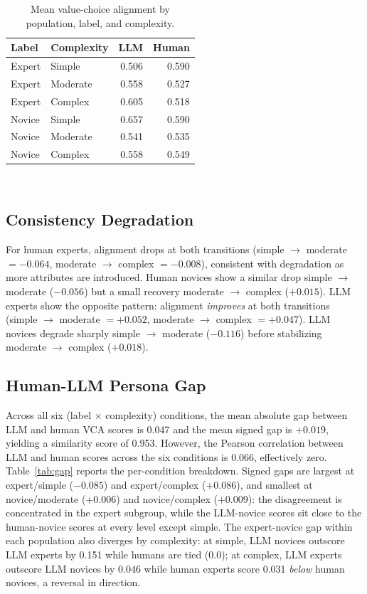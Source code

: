 \documentclass{sigchi-ext}
\begin{document}
\begin{table}[h]
  \centering
  \begin{tabular}{l l r r}
    \toprule
    \textbf{Label} & \textbf{Complexity} & \textbf{LLM} & \textbf{Human} \\
    \midrule
    Expert & Simple   & 0.506 & 0.590 \\
    Expert & Moderate & 0.558 & 0.527 \\
    Expert & Complex  & 0.605 & 0.518 \\
    Novice & Simple   & 0.657 & 0.590 \\
    Novice & Moderate & 0.541 & 0.535 \\
    Novice & Complex  & 0.558 & 0.549 \\
    \bottomrule
  \end{tabular}
  \caption{Mean value-choice alignment by population, label, and complexity.}~\label{tab:vca}
\end{table}

\subsection{Consistency Degradation}
For human experts, alignment drops at both transitions (simple $\rightarrow$ moderate $= -0.064$, moderate $\rightarrow$ complex $= -0.008$), consistent with degradation as more attributes are introduced. Human novices show a similar drop simple $\rightarrow$ moderate ($-0.056$) but a small recovery moderate $\rightarrow$ complex ($+0.015$). LLM experts show the opposite pattern: alignment \emph{improves} at both transitions (simple $\rightarrow$ moderate $= +0.052$, moderate $\rightarrow$ complex $= +0.047$). LLM novices degrade sharply simple $\rightarrow$ moderate ($-0.116$) before stabilizing moderate $\rightarrow$ complex ($+0.018$).

\subsection{Human-LLM Persona Gap}
Across all six (label $\times$ complexity) conditions, the mean absolute gap between LLM and human VCA scores is 0.047 and the mean signed gap is $+0.019$, yielding a similarity score of 0.953. However, the Pearson correlation between LLM and human scores across the six conditions is 0.066, effectively zero. Table~\ref{tab:gap} reports the per-condition breakdown. Signed gaps are largest at expert/simple ($-0.085$) and expert/complex ($+0.086$), and smallest at novice/moderate ($+0.006$) and novice/complex ($+0.009$): the disagreement is concentrated in the expert subgroup, while the LLM-novice scores sit close to the human-novice scores at every level except simple. The expert-novice gap within each population also diverges by complexity: at simple, LLM novices outscore LLM experts by 0.151 while humans are tied (0.0); at complex, LLM experts outscore LLM novices by 0.046 while human experts score 0.031 \emph{below} human novices, a reversal in direction.
\end{document}

